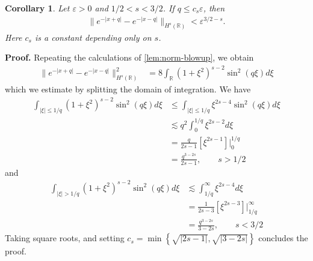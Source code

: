 \documentclass[12pt,reqno]{amsart}
\numberwithin{equation}{section}  %
\numberwithin{figure}{section}
\newcommand{\rr}{\mathbb{R}}
\newcommand{\ee}{\varepsilon}
\theoremstyle{plain}  %
\newtheorem{corollary}{Corollary}
\theoremstyle{definition}
\begin{document}
%
%
%
%
%
%
\begin{corollary}
  \label{cor:peakon-antipeakon-Hs-bound}
  Let $ \ee >0$ and $ 1/2< s < 3/2$. If $q \le c_s \ee$, then 
  \begin{equation}
    \label{peakon-antipeakon-Hs-bound}
    \begin{split}
      \|e^{-| x+ q |} - e^{-| x- q |} \|_{H^{s}(\rr)} < \ee^{3/2 - s}.
    \end{split}
  \end{equation}
  Here $c_s$ is a constant depending only on $s$. 
\end{corollary}
%
%
%
{\bf Proof.}
Repeating the calculations of \autoref{lem:norm-blowup}, we obtain %
%
\begin{equation*}
  \begin{split}
    \|e^{-| x+q |} - e^{-| x-q |} \|^2_{H^s(\rr)}
    & = 8 \int_{\rr} \left( 1 + \xi^2 \right)^{s-2} \sin^2(q \xi) d \xi
  \end{split}
\end{equation*}
%
%
which we estimate by splitting the domain of integration. We have
%
%
%
\begin{equation*}
  \begin{split}
    \int_{| \xi| \le 1/q } (1 + \xi^2)^{s-2} \sin^2(q \xi)d \xi
    & \le \int _{| \xi| \le 1/q }\xi^{2s-4} \sin^2(q \xi)d \xi
    \\
    & \lesssim q^{2} \int_{0}^{1/q} \xi^{2s-2} d \xi
    \\
    & = \frac{q}{2s-1} \left[ \xi^{2s-1} \right] \Big |_0^{1/q}
    \\
    & = \frac{q^{3-2s}}{2s-1}, \qquad s > 1/2
  \end{split}
\end{equation*}
%
%
and
%
%
\begin{equation*}
  \begin{split}
    \int_{| \xi | > 1/q }(1 + \xi^2)^{s-2} \sin^2(q \xi) d \xi
    & \lesssim \int_{1/q}^{\infty} \xi^{2s-4} d \xi
    \\
    & = \frac{1}{2s-3} \left[ \xi^{2s-3} \right] \Big |_{1/q}^{\infty}
    \\
    & = \frac{q^{3-2s}}{3-2s}, \qquad s < 3/2
  \end{split}
\end{equation*}
%
%
Taking square roots, and setting $c_s = \min \left\{ \sqrt{|2s-1|},
\sqrt{|3-2s|} \right\}$ concludes the proof.
\qquad \qedsymbol
\\
\end{document}
